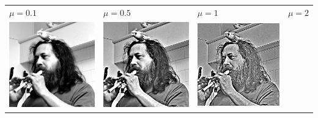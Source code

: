 \begin{tabular}{llll}
	$\mu=0.1$ &
	$\mu=0.5$ &
	$\mu=1$ &
	$\mu=2$\\
	\includegraphics{weiro-riesz01.png} &
	\includegraphics{weiro-riesz05.png} &
	\includegraphics{weiro-riesz10.png} &

\end{tabular}
